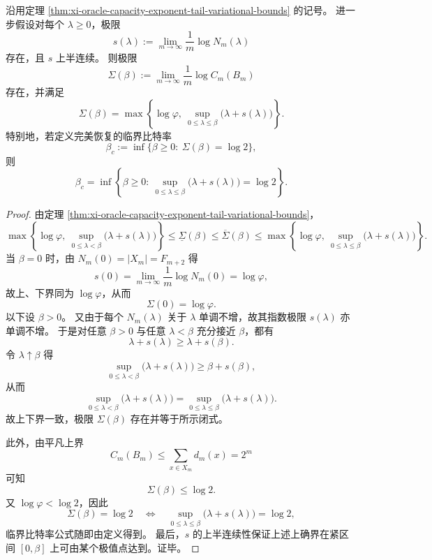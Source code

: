 \begin{corollary}\label{cor:xi-oracle-capacity-exponent-closed-form-tail-spectrum}
沿用定理 \ref{thm:xi-oracle-capacity-exponent-tail-variational-bounds} 的记号。
进一步假设对每个 \(\lambda\ge 0\)，极限
\[
s(\lambda):=\lim_{m\to\infty}\frac1m\log N_m(\lambda)
\]
存在，且 \(s\) 上半连续。
则极限
\[
\Sigma(\beta):=\lim_{m\to\infty}\frac1m\log C_m(B_m)
\]
存在，并满足
\[
\boxed{\;
\Sigma(\beta)=
\max\!\left\{\log\varphi,\ \sup_{0\le \lambda\le \beta}\bigl(\lambda+s(\lambda)\bigr)\right\}. \;}
\]
特别地，若定义完美恢复的临界比特率
\[
\beta_c:=\inf\{\beta\ge 0:\ \Sigma(\beta)=\log 2\},
\]
则
\[
\boxed{\;
\beta_c=
\inf\!\left\{
\beta\ge 0:\ 
\sup_{0\le \lambda\le \beta}\bigl(\lambda+s(\lambda)\bigr)=\log 2
\right\}. \;}
\]
\end{corollary}
\begin{proof}
由定理 \ref{thm:xi-oracle-capacity-exponent-tail-variational-bounds}，
\[
\max\!\left\{\log\varphi,\ \sup_{0\le \lambda<\beta}\bigl(\lambda+s(\lambda)\bigr)\right\}
\le
\underline\Sigma(\beta)
\le
\overline\Sigma(\beta)
\le
\max\!\left\{\log\varphi,\ \sup_{0\le \lambda\le \beta}\bigl(\lambda+s(\lambda)\bigr)\right\}.
\]
当 \(\beta=0\) 时，由 \(N_m(0)=|X_m|=F_{m+2}\) 得
\[
s(0)=\lim_{m\to\infty}\frac1m\log N_m(0)=\log\varphi,
\]
故上、下界同为 \(\log\varphi\)，从而
\[
\Sigma(0)=\log\varphi.
\]
以下设 \(\beta>0\)。
又由于每个 \(N_m(\lambda)\) 关于 \(\lambda\) 单调不增，故其指数极限 \(s(\lambda)\) 亦单调不增。
于是对任意 \(\beta>0\) 与任意 \(\lambda<\beta\) 充分接近 \(\beta\)，都有
\[
\lambda+s(\lambda)\ge \lambda+s(\beta).
\]
令 \(\lambda\uparrow \beta\) 得
\[
\sup_{0\le \lambda<\beta}\bigl(\lambda+s(\lambda)\bigr)\ge \beta+s(\beta),
\]
从而
\[
\sup_{0\le \lambda<\beta}\bigl(\lambda+s(\lambda)\bigr)
=
\sup_{0\le \lambda\le \beta}\bigl(\lambda+s(\lambda)\bigr).
\]
故上下界一致，极限 \(\Sigma(\beta)\) 存在并等于所示闭式。
\par
此外，由平凡上界
\[
C_m(B_m)\le \sum_{x\in X_m}d_m(x)=2^m
\]
可知
\[
\Sigma(\beta)\le \log 2.
\]
又 \(\log\varphi<\log 2\)，因此
\[
\Sigma(\beta)=\log 2
\quad\Longleftrightarrow\quad
\sup_{0\le \lambda\le \beta}\bigl(\lambda+s(\lambda)\bigr)=\log 2,
\]
临界比特率公式随即由定义得到。
最后，\(s\) 的上半连续性保证上述上确界在紧区间 \([0,\beta]\) 上可由某个极值点达到。证毕。
\end{proof}



